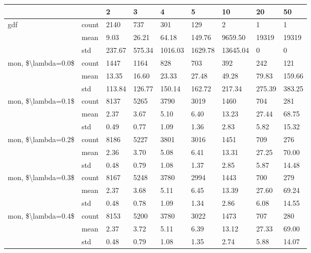 \begin{tabular}{lllllllll}
\toprule
                   &     &     2  &     3  &      4  &      5  &       10 &     20 &     50 \\
\midrule
gdf & count &   2140 &    737 &     301 &     129 &        2 &      1 &      1 \\
                   & mean &   9.03 &  26.21 &   64.18 &  149.76 &  9659.50 &  19319 &  19319 \\
                   & std & 237.67 & 575.34 & 1016.03 & 1629.78 & 13645.04 &      0 &      0 \\
mon, \$\textbackslash lambda=0.0\$ & count &   1447 &   1164 &     828 &     703 &      392 &    242 &    121 \\
                   & mean &  13.35 &  16.60 &   23.33 &   27.48 &    49.28 &  79.83 & 159.66 \\
                   & std & 113.84 & 126.77 &  150.14 &  162.72 &   217.34 & 275.39 & 383.25 \\
mon, \$\textbackslash lambda=0.1\$ & count &   8137 &   5265 &    3790 &    3019 &     1460 &    704 &    281 \\
                   & mean &   2.37 &   3.67 &    5.10 &    6.40 &    13.23 &  27.44 &  68.75 \\
                   & std &   0.49 &   0.77 &    1.09 &    1.36 &     2.83 &   5.82 &  15.32 \\
mon, \$\textbackslash lambda=0.2\$ & count &   8186 &   5227 &    3801 &    3016 &     1451 &    709 &    276 \\
                   & mean &   2.36 &   3.70 &    5.08 &    6.41 &    13.31 &  27.25 &  70.00 \\
                   & std &   0.48 &   0.79 &    1.08 &    1.37 &     2.85 &   5.87 &  14.48 \\
mon, \$\textbackslash lambda=0.3\$ & count &   8167 &   5248 &    3780 &    2994 &     1443 &    700 &    279 \\
                   & mean &   2.37 &   3.68 &    5.11 &    6.45 &    13.39 &  27.60 &  69.24 \\
                   & std &   0.48 &   0.78 &    1.09 &    1.34 &     2.86 &   6.08 &  14.55 \\
mon, \$\textbackslash lambda=0.4\$ & count &   8153 &   5200 &    3780 &    3022 &     1473 &    707 &    280 \\
                   & mean &   2.37 &   3.72 &    5.11 &    6.39 &    13.12 &  27.33 &  69.00 \\
                   & std &   0.48 &   0.79 &    1.08 &    1.35 &     2.74 &   5.88 &  14.07 \\

\end{tabular}
